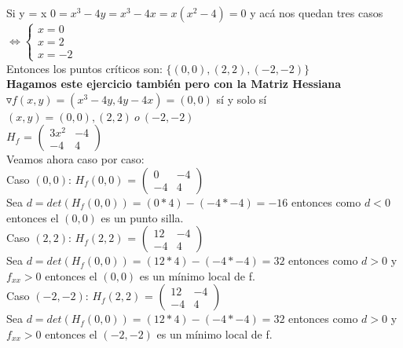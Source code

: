 \documentclass[10pt,a4paper]{article}
\begin{document}
Si y = x $0 = x^{3}-4y = x^{3}-4x = x(x^{2}-4) = 0$ y acá nos quedan tres casos \( \iff
\begin{cases} 
    x = 0 \\
    x = 2  \\
    x = -2  
\end{cases}
\) \\
Entonces los puntos críticos son: $\{(0,0), (2, 2), (-2, -2)\}$ \\
\textbf{Hagamos este ejercicio también pero con la Matriz Hessiana} \\
$\triangledown f(x,y) = (x^{3}-4y, 4y-4x) = (0,0)$ sí y solo sí $(x,y) = (0,0), (2,2) \ o \ (-2, -2)$ \\
$H_{f}$ = \(
\begin{pmatrix}
3x^{2} & -4 \\
-4 & 4
\end{pmatrix}
\) \\
Veamos ahora caso por caso: \\
Caso $(0,0)$: 
$H_{f}(0,0)$ = \(\begin{pmatrix}
0 & -4 \\
-4 & 4
\end{pmatrix}
\) \\
Sea $d = det(H_{f}(0,0)) = (0 * 4) - (-4 * -4) = -16$ entonces como $d<0$ entonces el $(0,0)$ es un punto silla. \\
Caso $(2, 2)$: 
$H_{f}(2,2)$ = \(\begin{pmatrix}
12 & -4 \\
-4 & 4
\end{pmatrix}
\) \\
Sea $d = det(H_{f}(0,0)) = (12 * 4) - (-4 * -4) = 32$ entonces como $d>0$ y $f_{xx}>0$ entonces el $(0,0)$ es un mínimo local de f. \\
Caso $(-2, -2)$: 
$H_{f}(2,2)$ = \(\begin{pmatrix}
12 & -4 \\
-4 & 4
\end{pmatrix}
\) \\
Sea $d = det(H_{f}(0,0)) = (12 * 4) - (-4 * -4) = 32$ entonces como $d>0$ y $f_{xx}>0$ entonces el $(-2, -2)$ es un mínimo local de f. \\
\end{document}
